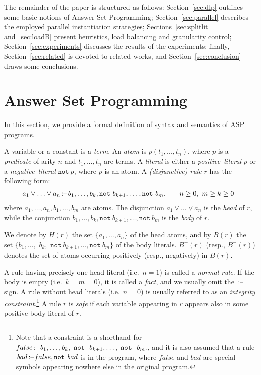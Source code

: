 \documentclass[preprint]{tlp}
\newcommand{\derives}{\ensuremath{\mbox{\,$:$--}\,}\xspace}
\newcommand{\naf}{\ensuremath{\mathtt{not\ }}}
\newenvironment{dlvcodel}
  {\begin{displaymath}\hspace{-0.24cm}\begin{array}{l}}
  {\end{array}\end{displaymath}}
\begin{document}
The remainder of the paper is structured as follows:
Section~\ref{sec:dlp} outlines some basic notions of Answer Set
Programming;  Section~\ref{sec:parallel} describes
the employed parallel instantiation
strategies; Sections~\ref{sec:splitlit} and~\ref{sec:loadB} present heuristics, load balancing and granularity control;
Section~\ref{sec:experiments} discusses the results of
the experiments; finally, Section~\ref{sec:related} is devoted to
related works, and Section~\ref{sec:conclusion} draws some
conclusions.

\section{Answer Set Programming}\label{sec:preliminaries}\label{sec:dlp}\label{sec:ASP}

In this section, we provide a formal definition of syntax and semantics of ASP programs.

A variable or a constant is a {\em term}.  An {\em atom} is
$p(t_{1},..., t_{n})$, where $p$ is a {\em predicate} of arity $n$
and $t_{1},..., t_{n}$ are terms.  A {\em literal} is either a {\em
positive~literal} $p$ or a {\em negative~literal} $\naf p$, where
$p$ is an atom.
 A {\em (disjunctive) rule} $r$ has the following
form:
\begin{dlvcodel}
a_1\lor\ldots\lor a_n \derives
        b_1,\ldots, b_k,
        \naf b_{k+1},\ldots, \naf b_m.  \quad \quad n\geq 0,\ m\geq k\geq 0
\end{dlvcodel}
\hspace{-0.25cm} where $a_1,\ldots ,a_n,b_1,\ldots ,b_m$ are atoms.
 The
disjunction $a_1\lor\ldots\lor a_n$ is the {\em head} of $r$, while
the conjunction $b_1 , \ldots,  b_k, \naf b_{k+1} , \ldots, \naf
b_m$ is the {\em body} of $r$.

We denote by $H(r)$ the set $\{a_1, \ldots, a_n \}$ of the head
atoms, and by $B(r)$ the set $\{b_1, \ldots,$ $b_k,$ $\naf b_{k+1}
,\ldots , \naf b_m \}$ of the body literals. $B^+(r)$ (resp.,
$B^-(r)$) denotes the set of atoms occurring positively (resp.,
negatively) in $B(r)$.

A rule having precisely one head literal (i.e.\ $n=1$) is called a
{\em normal rule}. If the body is empty (i.e.\ $k=m=0$), it is
called a {\em fact}, and we usually omit the $\derives$ sign. A rule
without head literals (i.e.\ $n=0$) is usually referred to as an
{\em integrity constraint}.\footnote{Note that a constraint is a
shorthand for ${\mathit false} \derives b_1,\ldots, b_k,\ \naf\
b_{k+1},\ldots,\ \naf\ b_m.$, and it is also assumed that a rule
${\mathit bad} \derives {\mathit false}, \naf {\mathit bad}$ is in
the program, where $\mathit{ false}$ and $\mathit{ bad}$ are special
symbols appearing nowhere else in the original program. } A rule $r$
is {\em safe} if each variable appearing in $r$ appears also in some
positive body literal of $r$.
\end{document}
